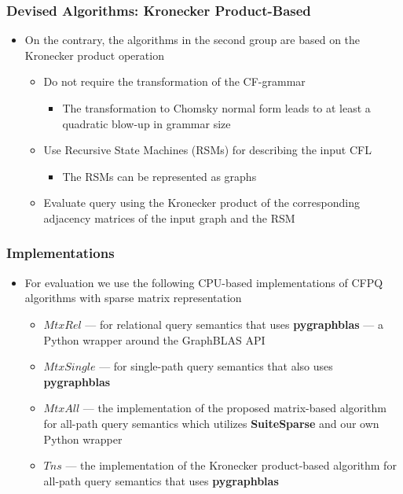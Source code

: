 \documentclass[xcolor=table,aspectratio=169]{beamer}
\begin{document}
\begin{frame}[fragile] \frametitle{Devised Algorithms: Kronecker Product-Based}
	\begin{itemize}
		\item On the contrary, the algorithms in the second group are based on the Kronecker product operation
		\begin{itemize}
			\item Do not require the transformation of the CF-grammar
			\begin{itemize}
				\item The transformation to Chomsky normal form leads to at least a quadratic blow-up in grammar	size
			\end{itemize}
			\item Use Recursive State Machines (RSMs) for describing the input CFL
			\begin{itemize}
				\item The RSMs can be represented as graphs
			\end{itemize}
			\item Evaluate query using the Kronecker product of the corresponding adjacency matrices of the input graph and the RSM
		\end{itemize}
	\end{itemize}
\end{frame}

\begin{frame}[fragile] \frametitle{Implementations}

\begin{itemize}
	\item For evaluation we use the following CPU-based implementations of CFPQ algorithms with sparse matrix representation
	\begin{itemize}
		\item \textbf{$MtxRel$} --- for  relational query semantics that uses \textbf{pygraphblas} --- a Python wrapper around the GraphBLAS API
		\item \textbf{$MtxSingle$} --- for  single-path query semantics that also uses \textbf{pygraphblas}
		\item \textbf{$MtxAll$} --- the implementation of the proposed matrix-based algorithm for all-path query semantics which utilizes \textbf{SuiteSparse} and our own Python wrapper
		\item \textbf{$Tns$} --- the implementation of the Kronecker product-based algorithm for all-path query semantics that uses \textbf{pygraphblas}
		
	\end{itemize}
\end{itemize}
\end{frame}
\end{document}
